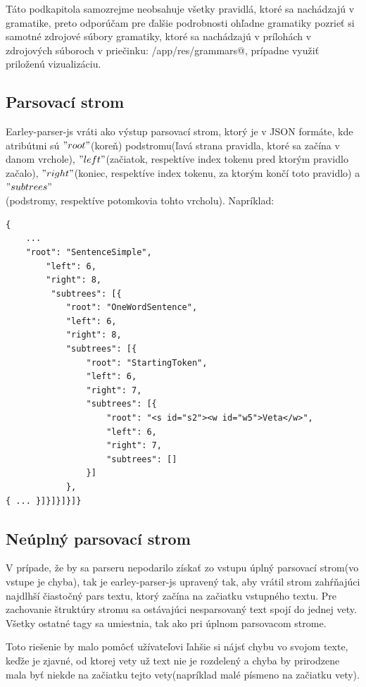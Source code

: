 \documentclass[12pt,a4paper]{report}
\theoremstyle{definition}
\theoremstyle{remark}
\begin{document}
\newpage
Táto podkapitola samozrejme neobsahuje všetky pravidlá, ktoré sa nachádzajú v gramatike, preto odporúčam pre ďalšie podrobnosti ohľadne gramatiky pozrieť si samotné zdrojové súbory gramatiky, ktoré sa nachádzajú v prílohách v zdrojových súboroch v priečinku: \verb@parser/app/res/grammars@, prípadne využiť priloženú vizualizáciu.


\subsection{Parsovací strom}
Earley-parser-js vráti ako výstup parsovací strom, ktorý je v JSON formáte, kde atribútmi sú $"root"$(koreň) podstromu(ľavá strana pravidla, ktoré sa začína v danom vrchole), $"left"$(začiatok, respektíve index tokenu pred ktorým pravidlo začalo), $"right"$(koniec, respektíve index tokenu, za ktorým končí toto pravidlo) a $"subtrees"$ \\ (podstromy, respektíve potomkovia tohto vrcholu). Napríklad: 
\begin{lstlisting}[caption=Parsovací strom vytvorený pomocou earley-parser-js,style=htmlcssjs, basicstyle=\fontsize{9}{11}\ttfamily]
 {
 	...
	"root": "SentenceSimple",
		"left": 6,
		"right": 8,
		 "subtrees": [{
			"root": "OneWordSentence",
			"left": 6,
			"right": 8,
			"subtrees": [{
				"root": "StartingToken",
				"left": 6,
				"right": 7,
				"subtrees": [{
					"root": "<s id="s2"><w id="w5">Veta</w>",
					"left": 6,
					"right": 7,
					"subtrees": []
				}]
			},
{ ... }]}]}]}]}
\end{lstlisting}




\subsection{Neúplný parsovací strom}
V prípade, že by sa parseru nepodarilo získať zo vstupu úplný parsovací strom(vo vstupe je chyba), tak je earley-parser-js upravený tak, aby vrátil strom zahŕňajúci najdlhší čiastočný pars textu, ktorý začína na začiatku vstupného textu. Pre zachovanie štruktúry stromu sa ostávajúci nesparsovaný text spojí do jednej vety. Všetky ostatné tagy sa umiestnia, tak ako pri úplnom parsovacom strome.

Toto riešenie by malo pomôcť užívateľovi ľahšie si nájsť chybu vo svojom texte, keďže je zjavné, od ktorej vety už text nie je rozdelený a chyba by prirodzene mala byť niekde na začiatku tejto vety(napríklad malé písmeno na začiatku vety).
\end{document}
